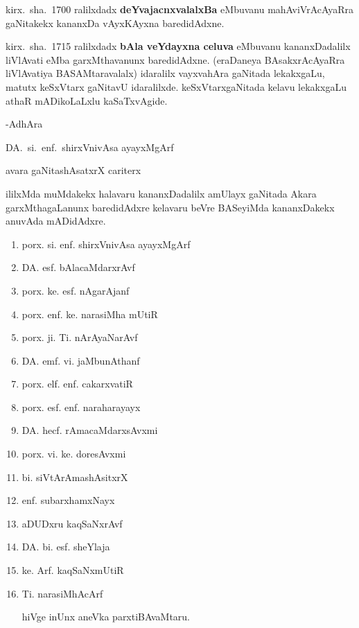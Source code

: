 kirx.~sha.~{\rm 1700} ralilxdadx \textbf{deYvajacnxvalalxBa} eMbuvanu mahAviVrAcAyaRra gaNitakekx kananxDa vAyxKAyxna baredidAdxne.

kirx.~sha.~{\rm 1715} ralilxdadx \textbf{bAla veYdayxna celuva} eMbuvanu kananxDadalilx liVlAvati eMba garxMthavanunx baredidAdxne. (eraDaneya BAsakxrAcAyaRra liVlAvatiya BASAMtaravalalx) idaralilx vayxvahAra gaNitada lekakxgaLu, matutx keSxVtarx gaNitavU idaralilxde. keSxVtarxgaNitada kelavu lekakxgaLu athaR mADikoLaLxlu kaSaTxvAgide.

\medskip
\hfill{-AdhAra}\hspace{1.8cm}

\hfill{DA.~si.~enf.~shirxVnivAsa ayayxMgArf}

\hfill{avara gaNitashAsatxrX cariterx}\hspace{1cm}
\newpage

ililxMda muMdakekx halavaru kananxDadalilx amUlayx gaNitada Akara garxMthagaLanunx baredidAdxre kelavaru beVre BASeyiMda kananxDakekx anuvAda mADidAdxre.
\begin{enumerate}[\rm 1)]
\itemsep=0pt
\item porx. si. enf. shirxVnivAsa ayayxMgArf

\item DA. esf. bAlacaMdarxrAvf

\item porx. ke. esf. nAgarAjanf

\item porx. enf. ke. narasiMha mUtiR

\item porx. ji. Ti. nArAyaNarAvf

\item DA. emf. vi. jaMbunAthanf

\item porx. elf. enf. cakarxvatiR

\item porx. esf. enf. naraharayayx

\item DA. hecf. rAmacaMdarxsAvxmi

\item porx. vi. ke. doresAvxmi

\item bi. siVtArAmashAsitxrX

\item enf. subarxhamxNayx

\item aDUDxru kaqSaNxrAvf

\item DA. bi. esf. sheYlaja

\item ke. Arf. kaqSaNxmUtiR

\item Ti. narasiMhAcArf

hiVge inUnx aneVka parxtiBAvaMtaru.
\end{enumerate}


